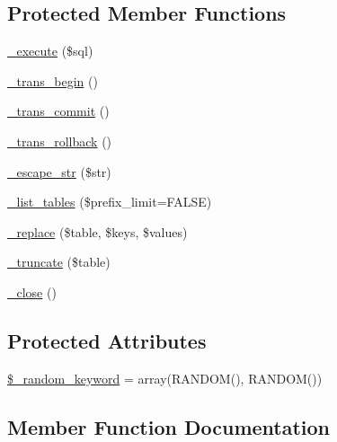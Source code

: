 \subsection*{Protected Member Functions}
\begin{DoxyCompactItemize}
\item 
\mbox{\hyperlink{class_c_i___d_b__sqlite3__driver_a114ab675d89bf8324a41785fb475e86d}{\+\_\+execute}} (\$sql)
\item 
\mbox{\hyperlink{class_c_i___d_b__sqlite3__driver_ac81ac882c1d54347d810199a15856aac}{\+\_\+trans\+\_\+begin}} ()
\item 
\mbox{\hyperlink{class_c_i___d_b__sqlite3__driver_a6fe7f373e0b11cfae23a5f41c0b35dda}{\+\_\+trans\+\_\+commit}} ()
\item 
\mbox{\hyperlink{class_c_i___d_b__sqlite3__driver_ad49a116b0776c26b53114c9093fd102a}{\+\_\+trans\+\_\+rollback}} ()
\item 
\mbox{\hyperlink{class_c_i___d_b__sqlite3__driver_af8ef0237bfcdb19215b63fff769e7a55}{\+\_\+escape\+\_\+str}} (\$str)
\item 
\mbox{\hyperlink{class_c_i___d_b__sqlite3__driver_a435c0f3ce54fe7daa178baa8532ebd54}{\+\_\+list\+\_\+tables}} (\$prefix\+\_\+limit=F\+A\+L\+SE)
\item 
\mbox{\hyperlink{class_c_i___d_b__sqlite3__driver_ae0adf73984daf2d42ad29b66c484c82b}{\+\_\+replace}} (\$table, \$keys, \$values)
\item 
\mbox{\hyperlink{class_c_i___d_b__sqlite3__driver_aa029600528fc1ce660a23ff4b4667f95}{\+\_\+truncate}} (\$table)
\item 
\mbox{\hyperlink{class_c_i___d_b__sqlite3__driver_a4d9082658000e5ede8312067c6dda9db}{\+\_\+close}} ()
\end{DoxyCompactItemize}
\subsection*{Protected Attributes}
\begin{DoxyCompactItemize}
\item 
\mbox{\hyperlink{class_c_i___d_b__sqlite3__driver_a10213aa6e05f6d924d3277bb1d2fea00}{\$\+\_\+random\+\_\+keyword}} = array(\textquotesingle{}R\+A\+N\+D\+OM()\textquotesingle{}, \textquotesingle{}R\+A\+N\+D\+OM()\textquotesingle{})
\end{DoxyCompactItemize}


\subsection{Member Function Documentation}
\mbox{\label{class_c_i___d_b__sqlite3__driver_a4d9082658000e5ede8312067c6dda9db}} 
